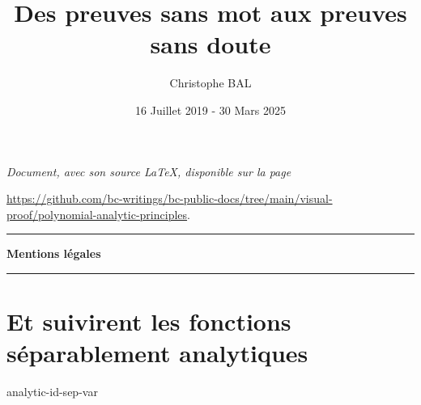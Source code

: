 \documentclass[12pt]{amsart}
\begin{document}
\title{Des preuves sans mot aux preuves sans doute}
\author{Christophe BAL}
\date{16 Juillet 2019 - 30 Mars 2025}

\maketitle

\begin{center}
	\itshape
	Document, avec son source \LaTeX, disponible sur la page

	\url{https://github.com/bc-writings/bc-public-docs/tree/main/visual-proof/polynomial-analytic-principles}.
\end{center}


\bigskip


\begin{center}
	\hrule\vspace{.3em}
	{
		\fontsize{1.35em}{1em}\selectfont
		\textbf{Mentions \og légales \fg}
	}

	\vspace{0.45em}
	\doclicenseThis
	\hrule
\end{center}


\bigskip


\setcounter{tocdepth}{1}
\tableofcontents



\newpage

%
%
%
%
%
%
%
%
%
%
%
%
%
%
\newpage
\section{Et suivirent les fonctions séparablement analytiques}

{analytic-id-sep-var}
\end{document}
